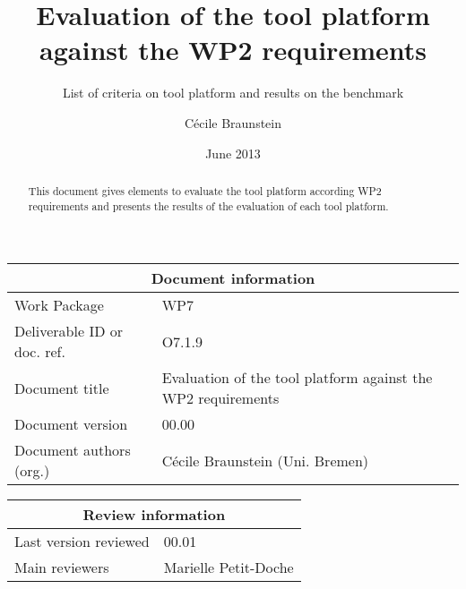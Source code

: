 \documentclass{openetcs_report}
\begin{document}
\frontmatter
{}




\title{Evaluation of the tool platform against the WP2 requirements }

\subtitle{List of criteria on tool platform and results on the benchmark}

\date{June 2013}


\author{C\'ecile Braunstein}

 


\begin{abstract}
This document gives elements to evaluate the tool platform according
WP2 requirements and presents the results of the evaluation of each
tool platform.
\end{abstract}

\maketitle
\tableofcontents
\listoffiguresandtables
\newpage


\begin{tabular}{|p{4.4cm}|p{8.7cm}|}
\hline
\multicolumn{2}{|c|}{Document information} \\
\hline
Work Package &  WP7  \\
Deliverable ID or doc. ref. & O7.1.9\\
\hline
Document title & Evaluation of the tool platform against the WP2 requirements \\
Document version & 00.00 \\
Document authors (org.)  & C\'ecile Braunstein (Uni. Bremen)  \\
\hline
\end{tabular}

\begin{tabular}{|p{4.4cm}|p{8.7cm}|}
\hline
\multicolumn{2}{|c|}{Review information} \\
\hline
Last version reviewed & 00.01 \\
\hline
Main reviewers & Marielle Petit-Doche\\
 \hline
\end{tabular}
\end{document}
